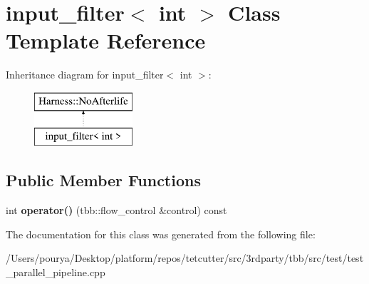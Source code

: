 \hypertarget{classinput__filter_3_01int_01_4}{}\section{input\+\_\+filter$<$ int $>$ Class Template Reference}
\label{classinput__filter_3_01int_01_4}
Inheritance diagram for input\+\_\+filter$<$ int $>$\+:\begin{figure}[H]
\begin{center}
\leavevmode
\includegraphics[height=2.000000cm]{classinput__filter_3_01int_01_4}
\end{center}
\end{figure}
\subsection*{Public Member Functions}
\begin{DoxyCompactItemize}
\item 
\hypertarget{classinput__filter_3_01int_01_4_a27c2b2d4a45740878dc4cee510c5f147}{}int {\bfseries operator()} (tbb\+::flow\+\_\+control \&control) const \label{classinput__filter_3_01int_01_4_a27c2b2d4a45740878dc4cee510c5f147}

\end{DoxyCompactItemize}


The documentation for this class was generated from the following file\+:\begin{DoxyCompactItemize}
\item 
/\+Users/pourya/\+Desktop/platform/repos/tetcutter/src/3rdparty/tbb/src/test/test\+\_\+parallel\+\_\+pipeline.\+cpp\end{DoxyCompactItemize}
